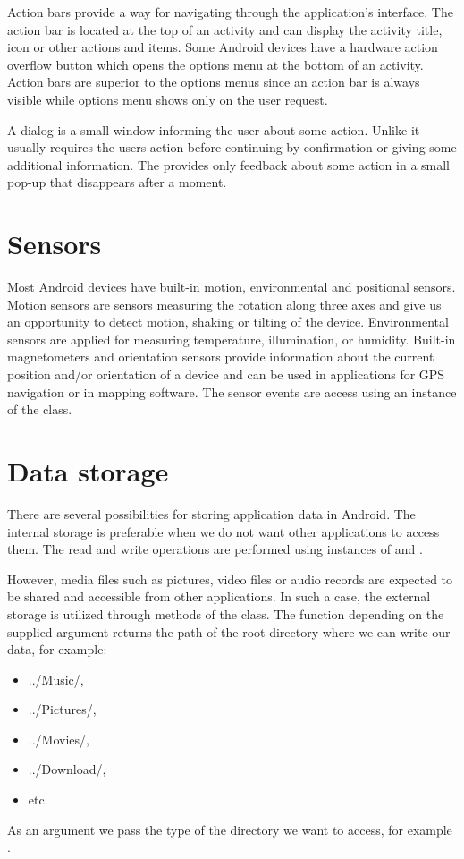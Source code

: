 Action bars provide a way for navigating through the application's interface. 
The action bar is located at the top of an activity and can display the activity title, icon or other actions and items.
Some Android devices have a hardware action overflow button which opens the options menu at the bottom of an activity. 
Action bars are superior to the options menus since an action bar is always visible while options menu shows only on the user request.

A dialog is a small window informing the user about some action. 
Unlike  it usually requires the users action before continuing by confirmation or giving some additional information.
The  provides only feedback about some action in a small pop-up that disappears after a moment.

\section{Sensors}

Most Android devices have built-in motion, environmental and positional sensors.
Motion sensors are sensors measuring the rotation along three axes and give us an opportunity to detect motion, shaking or tilting of the device. 
Environmental sensors are applied for measuring temperature, illumination, or humidity.
Built-in magnetometers and orientation sensors provide information about the current position and/or orientation of a device and can be used in applications for GPS navigation or in mapping software. 
The sensor events are access using an instance of the  class.

\section{Data storage}

There are several possibilities for storing application data in Android. 
The internal storage is preferable when we do not want other applications to access them. 
The read and write operations are performed using instances of  and .

However, media files such as pictures, video files or audio records are expected to be shared and accessible from other applications.
In such a case, the external storage is utilized through methods of the  class.
The function  depending on the supplied argument returns the path of the root directory where we can write our data, for example: 
\begin{itemize}
\item{../Music/,}
\item{../Pictures/,}
\item{../Movies/,}
\item{../Download/,}
\item{etc.}
\end{itemize}
As an argument we pass the type of the directory we want to access, for example .

